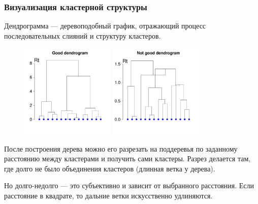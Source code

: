 \subsubsection{Визуализация кластерной структуры}
	\begin{dfn}
		Дендрограмма --- деревоподобный график, отражающий процесс последовательных слияний и структуру кластеров.
	\end{dfn}
	\begin{figure}[!h]
			\includegraphics[width=0.4\textwidth]{img/ward.pdf}
			\includegraphics[width=0.4\textwidth]{img/centroid.pdf}
	\end{figure}

После построения дерева можно его разрезать на поддеревья по заданному расстоянию между кластерами
и получить сами кластеры. Разрез делается там, где долго не было объединения кластеров (длинная ветка у дерева).

Но долго-недолго  --- это субъективно и зависит от выбранного расстояния. Если расстояние в квадрате, то дальние
ветки искусственно удлиняются. 